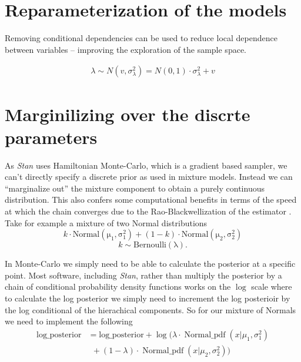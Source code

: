 \documentclass[11pt]{report}
\begin{document}
\section{Reparameterization of the models}

Removing conditional dependencies can be used to reduce local dependence between variables -- improving the exploration of the sample space.

\begin{align*}
\lambda \sim N(v, \sigma^2_\lambda) = N(0, 1) \cdot \sigma_\lambda^2 + v
\end{align*}


\section{Marginilizing over the discrte parameters}

As \emph{Stan} uses Hamiltonian Monte-Carlo, which is a gradient based sampler, we can't directly specify a discrete prior as used in mixture models. Instead we can ``marginalize out'' the mixture component to obtain a purely continuous distribution. This also confers some computational benefits in terms of the speed at which the chain converges due to the Rao-Blackwellization of the estimator \citep{rao}. \\

Take for example a mixture of two Normal distributions
\begin{equation}
  k \cdot \operatorname{Normal(\mu_1, \sigma_1^2)} + (1 - k) \cdot \operatorname{Normal(\mu_2, \sigma_2^2)}
\end{equation} 
\begin{equation}
  k \sim \operatorname{Bernoulli(\lambda)}.
\end{equation}

In Monte-Carlo we simply need to be able to calculate the posterior at a specific point. Most software, including \emph{Stan}, rather than multiply the posterior by a chain of conditional probability density functions works on the $\log$ scale where to calculate the log posterior we simply need to increment the log posterioir by the log conditional of the hierachical components. So for our mixture of Normals we need to implement the following
\begin{align}
  \text{log\_posterior} &= \text{log\_posterior} + \log(\lambda \cdot \operatorname{Normal\_pdf}(x | \mu_1, \sigma_1^2)  \nonumber \\
                   & \ \ + (1 - \lambda) \cdot \operatorname{Normal\_pdf}(x | \mu_2, \sigma_2^2))
\end{align}
\end{document}
